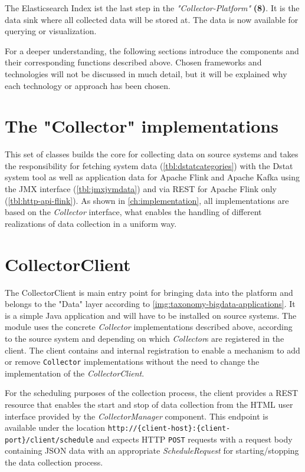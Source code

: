 The Elasticsearch Index ist the last step in the \textit{"Collector-Platform"} \textbf{(8)}. It is the data sink where all collected data will be stored at.
The data is now available for querying or visualization.

For a deeper understanding, the following sections introduce the components and their corresponding functions described above.
Chosen frameworks and technologies will not be discussed in much detail, but it will be explained why each technology or
approach has been chosen.

\section{The "Collector" implementations}

This set of classes builds the core for collecting data on source systems and takes the responsibility for fetching
system data (\autoref{tbl:dstatcategories}) with the Dstat system tool as well as application data for Apache Flink
and Apache Kafka using the JMX interface (\autoref{tbl:jmxjvmdata}) and via REST for Apache Flink only
(\autoref{tbl:http-api-flink}). As shown in \autoref{ch:implementation}, all implementations are based on the
\textit{Collector} interface, what enables the handling of different realizations of data collection in a uniform way.

\section{CollectorClient}

The CollectorClient is main entry point for bringing data into the platform and belongs to the "Data" layer according to
\autoref{img:taxonomy-bigdata-applications}. It is a simple Java application and will have to be installed on source systems.
The module uses the concrete \textit{Collector} implementations described above, according to the source system and
depending on which \textit{Collector}s are registered in the client. The client contains and internal registration to enable
a mechanism to add or remove \verb|Collector| implementations without the need to change the implementation of the
\textit{CollectorClient}.

For the scheduling purposes of the collection process, the client provides a REST resource that enables the start and stop of data
collection from the HTML user interface provided by the \textit{CollectorManager} component.
This endpoint is available under the location \verb|http://{client-host}:{client-port}/client/schedule| and expects HTTP \verb|POST| requests
with a request body containing JSON data with an appropriate \textit{ScheduleRequest} for starting/stopping the data collection process.

